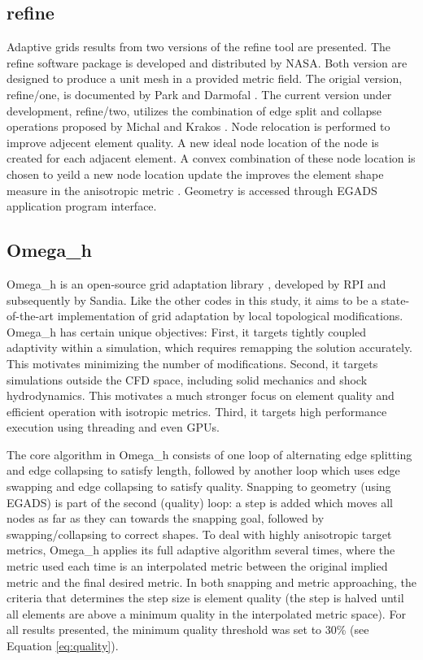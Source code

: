 \documentclass[3p,times,procedia,number]{elsarticle}
\begin{document}
\subsection{refine}

Adaptive grids results from two versions of the refine tool are presented.
The refine software package is developed and distributed by NASA.
Both version are designed to produce a
unit mesh \cite{loseille-alauzet-siamjna-2011-cont-mesh-framework-1}
in a provided metric field.
The origial version, refine/one, is documented
by Park and Darmofal \cite{park-darmofal-parallel-aniso-adapt-aiaa}.
The current version under development, refine/two,
utilizes the combination of edge split and collapse operations
proposed by Michal and Krakos \cite{michal-krakos-aniso-adapt-edge}.
Node relocation is performed to improve adjecent element quality.
A new ideal node location of the node is created
for each adjacent element.
A convex combination of these node location is chosen
to yeild a new node location update the improves
the element shape measure in the anisotropic
metric \cite{alauzet-topology-moving-mesh}.
Geometry is accessed through EGADS
application program interface.

\subsection{Omega\_h}

Omega\_h is an open-source grid adaptation library
\cite{ibanez-phd-thesis-heterogeneous-adapt,
ibanez-shephard-moving-shared-mem,
omega_h-website}, developed by RPI and subsequently by Sandia.
Like the other codes in this study, it aims to be a state-of-the-art
implementation of grid adaptation by local topological modifications.
Omega\_h has certain unique objectives:
First, it targets tightly coupled adaptivity within a simulation,
which requires remapping the solution accurately.
This motivates minimizing the number of modifications.
Second, it targets simulations outside the CFD space, including
solid mechanics and shock hydrodynamics.
This motivates a much stronger focus on element quality
and efficient operation with isotropic metrics.
Third, it targets high performance execution using threading
and even GPUs.

The core algorithm in Omega\_h consists of one loop of alternating
edge splitting and edge collapsing to satisfy length, followed by another loop
which uses edge swapping and edge collapsing to satisfy quality.
Snapping to geometry (using EGADS) is part of the second (quality) loop:
a step is added which moves all nodes as far as they can towards
the snapping goal, followed by swapping/collapsing to correct shapes.
To deal with highly anisotropic target metrics, Omega\_h applies
its full adaptive algorithm several times, where the metric used
each time is an interpolated metric between the original implied metric
and the final desired metric.
In both snapping and metric approaching, the criteria that determines
the step size is element quality (the step is halved until all elements
are above a minimum quality in the interpolated metric space).
For all results presented, the minimum quality threshold was set to 30\%
(see Equation \ref{eq:quality}).
\end{document}
